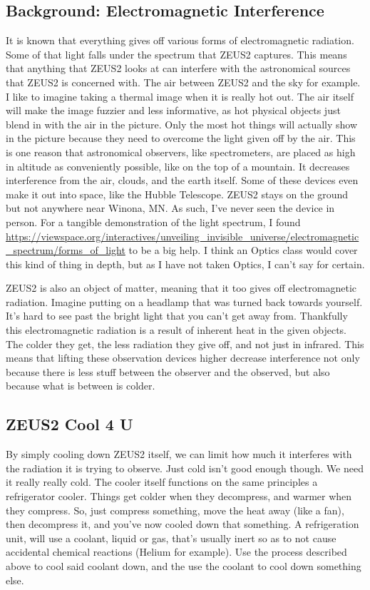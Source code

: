 \documentclass[prb,preprint]{revtex4-1}
\begin{document}
\subsection{Background: Electromagnetic Interference}
It is known that everything gives off various forms of electromagnetic radiation. Some of that light falls under the spectrum that ZEUS2 captures. This means that anything that ZEUS2 looks at can interfere with the astronomical sources that ZEUS2 is concerned with. The air between ZEUS2 and the sky for example. I like to imagine taking a thermal image when it is really hot out. The air itself will make the image fuzzier and less informative, as hot physical objects just blend in with the air in the picture. Only the most hot things will actually show in the picture because they need to overcome the light given off by the air. This is one reason that astronomical observers, like spectrometers, are placed as high in altitude as conveniently possible, like on the top of a mountain. It decreases interference from the air, clouds, and the earth itself. Some of these devices even make it out into space, like the Hubble Telescope.  ZEUS2 stays on the ground but not anywhere near Winona, MN. As such, I've never seen the device in person. For a tangible demonstration of the light spectrum, I found \url{https://viewspace.org/interactives/unveiling_invisible_universe/electromagnetic_spectrum/forms_of_light} to be a big help. I think an Optics class would cover this kind of thing in depth, but as I have not taken Optics, I can't say for certain.

ZEUS2 is also an object of matter, meaning that it too gives off electromagnetic radiation. Imagine putting on a headlamp that was turned back towards yourself. It's hard to see past the bright light that you can't get away from. Thankfully this electromagnetic radiation is a result of inherent heat in the given objects. The colder they get, the less radiation they give off, and not just in infrared. This means that lifting these observation devices higher decrease interference not only because there is less stuff between the observer and the observed, but also because what is between is colder. 

\subsection{ZEUS2 Cool 4 U}
By simply cooling down ZEUS2 itself, we can limit how much it interferes with the radiation it is trying to observe. Just cold isn't good enough though. We need it really really cold. The cooler itself functions on the same principles a refrigerator cooler. Things get colder when they decompress, and warmer when they compress. So, just compress something, move the heat away (like a fan), then decompress it, and you've now cooled down that something. A refrigeration unit, will use a coolant, liquid or gas, that's usually inert so as to not cause accidental chemical reactions (Helium for example). Use the process described above to cool said coolant down, and the use the coolant to cool down something else.
\end{document}
